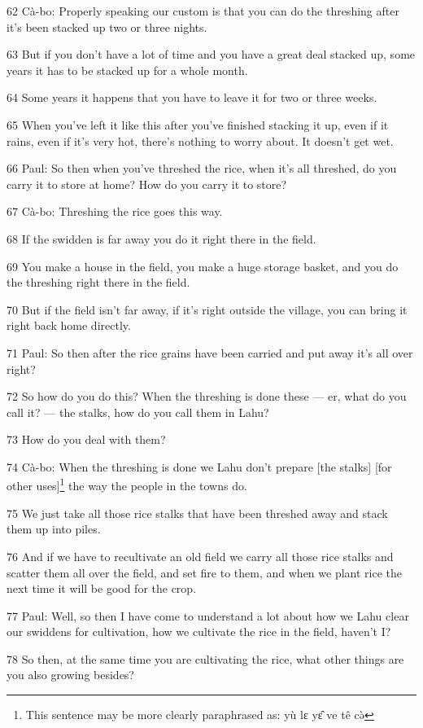 62 Cà-bo: Properly speaking our custom is that you can do the threshing after
it's been stacked up two or three nights.

63 But if you don't have a lot of time and you have a great deal stacked up, some
years it has to be stacked up for a whole month.

64 Some years it happens that you have to leave it for two or three weeks.

65 When you've left it like this after you've finished stacking it up, even if
it rains, even if it's very hot, there's nothing to worry about. It doesn't get
wet.

66 Paul: So then when you've threshed the rice, when it's all threshed, do you
carry it to store at home? How do you carry it to store?

67 Cà-bo: Threshing the rice goes this way.

68 If the swidden is far away you do it right there in the field.

69 You make a house in the field, you make a huge storage basket, and you do the
threshing right there in the field.

70 But if the field isn't far away, if it's right outside the village, you can
bring it right back home directly.

71 Paul: So then after the rice grains have been carried and put away it's all
over right?

72 So how do you do this? When the threshing is done these --- er, what do you
call it? --- the stalks, how do you call them in Lahu?

73 How do you deal with them?

74 Cà-bo: When the threshing is done we Lahu don't prepare [the stalks] [for other
uses]\footnote{This sentence may be more clearly paraphrased as: yù lɛ yɛ̂ ve tê cə̀} the way the people in the towns do.

75 We just take all those rice stalks that have been threshed away and stack them
up into piles.

76 And if we have to recultivate an old field we carry all those rice stalks and
scatter them all over the field, and set fire to them, and when we plant rice the
next time it will be good for the crop.

77 Paul: Well, so then I have come to understand a lot about how we Lahu clear
our swiddens for cultivation, how we cultivate the rice in the field, haven't I?

78 So then, at the same time you are cultivating the rice, what other things are
you also growing besides?

